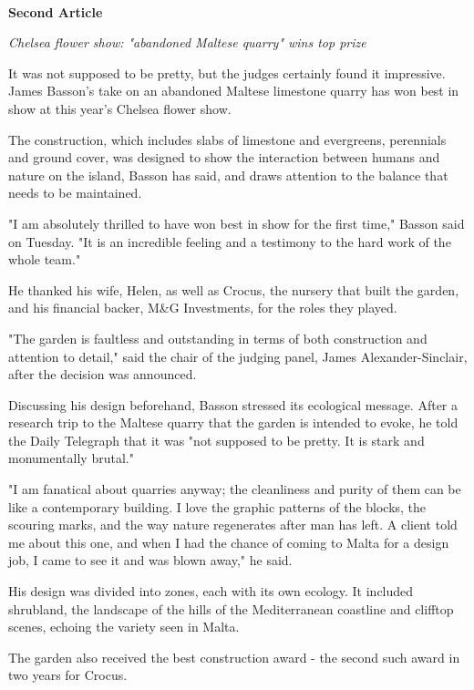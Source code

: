 \documentclass[12pt]{article}
\begin{document}
\textbf{\\ Second Article}

\begin{mdframed}

\emph{Chelsea flower show: "abandoned Maltese quarry" wins top prize} \cite{cfsarticle}

It was not supposed to be pretty, but the judges certainly found it impressive. James Basson's take on an abandoned Maltese limestone quarry has won best in show at this year's Chelsea flower show.

The construction, which includes slabs of limestone and evergreens, perennials and ground cover, was designed to show the interaction between humans and nature on the island, Basson has said, and draws attention to the balance that needs to be maintained.
 
"I am absolutely thrilled to have won best in show for the first time," Basson said on Tuesday. "It is an incredible feeling and a testimony to the hard work of the whole team."

He thanked his wife, Helen, as well as Crocus, the nursery that built the garden, and his financial backer, M\&G Investments, for the roles they played.

"The garden is faultless and outstanding in terms of both construction and attention to detail," said the chair of the judging panel, James Alexander-Sinclair, after the decision was announced.

Discussing his design beforehand, Basson stressed its ecological message. After a research trip to the Maltese quarry that the garden is intended to evoke, he told the Daily Telegraph that it was "not supposed to be pretty. It is stark and monumentally brutal."

"I am fanatical about quarries anyway; the cleanliness and purity of them can be like a contemporary building. I love the graphic patterns of the blocks, the scouring marks, and the way nature regenerates after man has left. A client told me about this one, and when I had the chance of coming to Malta for a design job, I came to see it and was blown away," he said.

His design was divided into zones, each with its own ecology. It included shrubland, the landscape of the hills of the Mediterranean coastline and clifftop scenes, echoing the variety seen in Malta.

The garden also received the best construction award - the second such award in two years for Crocus.


\end{mdframed}
\end{document}
